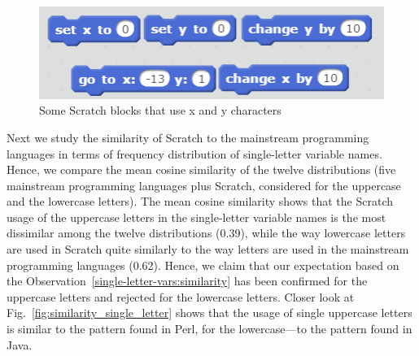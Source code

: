 \documentclass[conference]{IEEEtran}
\newcommand{\todo}[1]{ \textbf{#1} }
\begin{document}
\begin{figure}[h]
	\begin{center}
		\includegraphics[width=\columnwidth]{fig/builtinblocks_xy}
		\caption{Some Scratch blocks that use x and y characters}
		\label{fig:xy_Scratchblocks}
	\end{center}
\end{figure} 


Next we study the similarity of Scratch to the mainstream programming languages in terms of frequency distribution of single-letter variable names.
Hence, we compare the mean cosine similarity of the twelve distributions (five mainstream programming languages plus Scratch, considered for the uppercase and the lowercase letters).
The mean cosine similarity shows that the Scratch usage of the uppercase letters in the single-letter variable names is the most dissimilar among the
twelve distributions (0.39), while the way lowercase letters are used in Scratch quite similarly to the way letters are used in the mainstream programming languages (0.62).
Hence, we claim that our expectation based on the Observation~\ref{single-letter-vars:similarity} has been confirmed for the uppercase letters and  rejected for the lowercase letters. 
Closer look at Fig.~\ref{fig:similarity_single_letter} shows that the usage of single uppercase letters is similar to the pattern found in Perl, for the lowercase---to the pattern found in Java.
\end{document}
